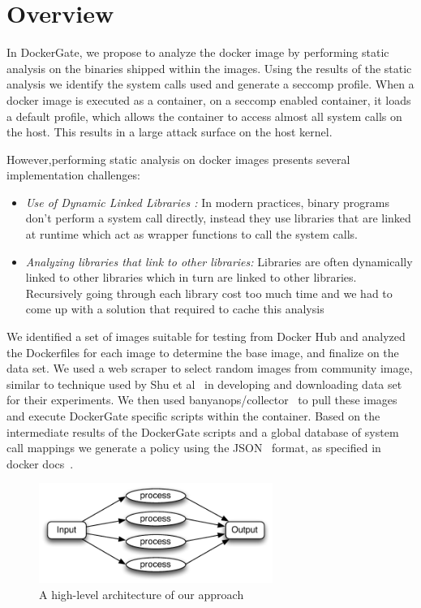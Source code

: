 \section{Overview}
\label{sec:overview}



In DockerGate, we propose to analyze the docker image by performing static analysis on the binaries shipped within the images. Using the results of the static analysis we identify the system calls used and generate a seccomp profile. When a docker image is executed as a container, on a seccomp enabled container, it loads a default profile, which allows the container to access almost all system calls on the host. This results in a large attack surface on the host kernel. 

However,performing static analysis on docker images presents several implementation challenges:
\begin{itemize}

\item \textit{ Use of Dynamic Linked Libraries :} In modern practices, binary programs don’t perform a system call directly, instead they use libraries that are linked at runtime which act as wrapper functions to call the system calls. 

\item \textit{ Analyzing libraries that link to other libraries:} Libraries are often dynamically linked to other libraries which in turn are linked to other libraries. Recursively going through each library cost too much time and we had to come up with a solution that required to cache this analysis
\end{itemize}
We identified a set of images suitable for testing from Docker Hub and analyzed the Dockerfiles for each image to determine the base image, and finalize on the data set. We used a web scraper to select random images from community image, similar to technique used by Shu et al~\cite{shu} in developing and downloading data set for their experiments. We then used banyanops/collector~\cite{banyanops} to pull these images and execute DockerGate specific scripts within the container. Based on the intermediate results of the DockerGate scripts and a global database of system call mappings we generate a policy using the JSON~\cite{json} format, as specified in docker docs~\cite{seccomp}.

\begin{figure}[t]
  \centering
  \includegraphics[width=3in]{figs/overview}
  \caption{A high-level architecture of our approach}
  \label{fig:overview}
\end{figure}

